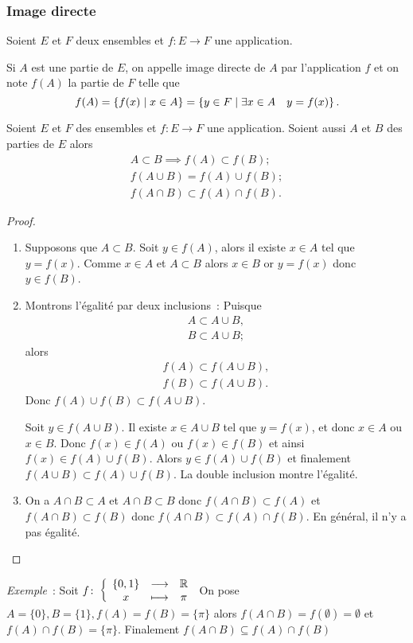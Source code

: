 \subsubsection{Image directe}
\label{chap3-subsec:imagedirecte}
Soient \(E\) et \(F\) deux ensembles et \(f: E \longrightarrow F\) une application.
\begin{defdef}
  Si \(A\) est une partie de \(E\), on appelle image directe de \(A\) par l'application \(f\) et on note \(f(A)\) la partie de \(F\) telle que
  \begin{equation}
    f(A)=\left\{f(x)\mathrel{}\middle|\mathrel{}x \in A\right\}=\left\{y \in F\mathrel{}\middle|\mathrel{}\exists x \in A \quad y=f(x)\right\}.
  \end{equation}
\end{defdef}
%
\begin{prop}
  Soient \(E\) et \(F\) des ensembles et \(f:E \longrightarrow F\) une application. Soient aussi \(A\) et \(B\) des parties de \(E\) alors
  \begin{gather}
    A \subset B \implies f(A) \subset f(B); \\
    f(A \cup B)=f(A) \cup f(B); \\
    f(A \cap B) \subset f(A) \cap f(B).
  \end{gather}
\end{prop}
\begin{proof}
  \begin{enumerate}
  \item Supposons que \(A \subset B\). Soit \(y \in f(A)\), alors il existe \(x \in A\) tel que \(y=f(x)\). Comme \(x \in A\) et \(A \subset B\) alors \(x \in B\) or \(y=f(x)\) donc \(y \in f(B)\).
  \item Montrons l'égalité par deux inclusions~: Puisque
      \begin{gather}
        A \subset A \cup B, \\
        B \subset A \cup B;
      \end{gather}
      alors
      \begin{gather}
        f(A) \subset f(A \cup B), \\
        f(B) \subset f(A \cup B).
      \end{gather}
      Donc \(f(A) \cup f(B) \subset f(A \cup B)\).
      
      Soit \(y \in f(A \cup B)\). Il existe \(x \in A \cup B\) tel que \(y=f(x)\), et donc \(x \in A\) ou \(x \in B\). Donc \(f(x) \in f(A)\) ou \(f(x) \in f(B)\) et ainsi \(f(x) \in f(A) \cup  f(B)\). Alors \(y \in f(A) \cup f(B)\) et finalement \(f(A \cup B) \subset f(A) \cup f(B)\). La double inclusion montre l'égalité.
  \item On a \(A \cap B \subset A\) et \(A \cap B \subset B\) donc \(f(A \cap B) \subset f(A)\) et \(f(A \cap B) \subset f(B)\) donc \(f(A \cap B) \subset f(A) \cap f(B)\). En général, il n'y a pas égalité.
  \end{enumerate}
\end{proof}
%
\emph{Exemple}~: Soit \(f\colon \left\{\begin{array}{ccc} \{0,1\} & \longrightarrow &\mathbb{R}\\ x & \longmapsto & \pi \end{array} \right.\) On pose \(A=\{0\}, B=\{1\}, f(A)=f(B)=\{\pi\}\) alors \(f(A \cap B)=f(\emptyset)=\emptyset\) et \(f(A) \cap f(B)=\{\pi\}\). Finalement \(f(A \cap B) \subseteq f(A) \cap f(B)\)

